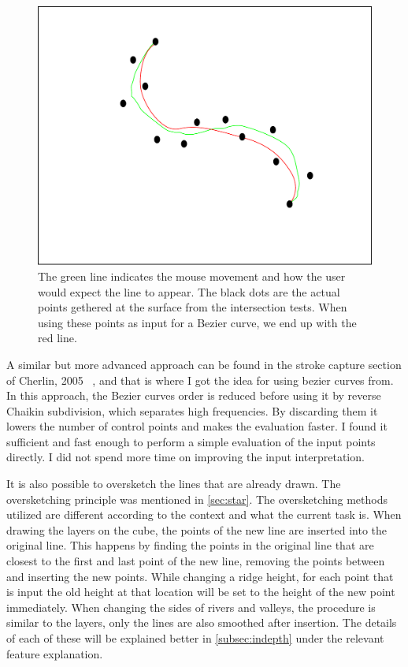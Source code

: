 \documentclass[a4paper,12pt]{report}
\newcommand{\secref}[1]{\autoref{#1}}
\begin{document}
\begin{figure}
\centering
 \includegraphics[width=0.7\linewidth]{thesis/bezierSmooth.pdf}
 \caption{The green line indicates the mouse movement and how the user would expect the line to appear. The black dots are the actual points gethered at the surface from the intersection tests. When using these points as input for a Bezier curve, we end up with the red line.}
 \label{fig:bezierSmooth}
\end{figure}


A similar but more advanced approach can be found in the stroke capture section of Cherlin, 2005 ~\cite{Cherlin:2005:SMF:1090122.1090145}, and that is where I got the idea for using bezier curves from. In this approach, the Bezier curves order is reduced before using it by reverse Chaikin subdivision, which separates high frequencies. By discarding them it lowers the number of control points and makes the evaluation faster. I found it sufficient and fast enough to perform a simple evaluation of the input points directly. I did not spend more time on improving the input interpretation.

It is also possible to oversketch the lines that are already drawn. The oversketching principle was mentioned in \secref{sec:star}. The oversketching methods utilized are different according to the context and what the current task is. When drawing the layers on the cube, the points of the new line are inserted into the original line. This happens by finding the points in the original line that are closest to the first and last point of the new line, removing the points between and inserting the new points. While changing a ridge height, for each point that is input the old height at that location will be set to the height of the new point immediately. When changing the sides of rivers and valleys, the procedure is similar to the layers, only the lines are also smoothed after insertion. The details of each of these will be explained better in \secref{subsec:indepth} under the relevant feature explanation.
\end{document}
